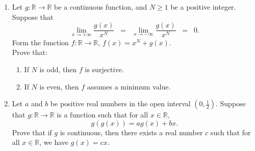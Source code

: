 \documentclass[11pt]{article}
\begin{document}
\begin{enumerate}
  \item Let \(g \colon \mathbb{R} \to \mathbb{R}\) be a continuous function, and \(N \geq 1\) be a positive 
    integer.  Suppose that 
    \[\lim_{x \to +\infty} \frac{g(x)}{x^N} \;\;=\;\; \lim_{x \to -\infty} \frac{g(x)}{x^N} \;\;=\;\;0.\]
    Form the function \(f \colon \mathbb{R} \to \mathbb{R}\), \(f(x) = x^N + g(x)\). \\
    Prove that:
    \begin{enumerate}[label=(\roman*)]
      \item If \(N\) is odd, then \(f\) is surjective.
      \item If \(N\) is even, then \(f\) assumes a minimum value.
    \end{enumerate}
  \newpage


\item Let \(a\) and \(b\) be positive real numbers in the open interval \(\left(0,\tfrac{1}{2}\right)\).  
  Suppose that \(g \colon \mathbb{R} \to \mathbb{R}\) is a function such that for all \(x \in \mathbb{R}\),
    \[g\left(g(x)\right) = ag(x) + bx.\]
    Prove that if \(g\) is continuous, then there exists a real number \(c\) such that for all \(x \in 
    \mathbb{R}\), we have \(g(x) = cx\). \\


\end{enumerate}
\end{document}
